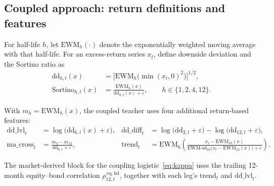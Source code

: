 \subsection{Coupled approach: return definitions and features}

For half-life \(h\), let \(\mathrm{EWM}_{h}(\cdot)\) denote the exponentially weighted moving
average with that half-life. For an excess-return series \(x_t\), define downside deviation
and the Sortino ratio as
\begin{align}
\mathrm{dd}_{h,t}(x)
&=
\Big[\mathrm{EWM}_{h}\big(\min(x_t,0)^2\big)\Big]^{1/2},
\\
\mathrm{Sortino}_{h,t}(x)
&=
\frac{\mathrm{EWM}_{h}(x)}{\mathrm{dd}_{h,t}(x)+\varepsilon},
\qquad
h\in\{1,2,4,12\}.
\end{align}

With \(m_h=\mathrm{EWM}_{h}(x)\), the coupled teacher uses four additional return-based
features:
\begin{align}
\mathrm{dd\_lvl}_t
&=
\log\!\big(\mathrm{dd}_{6,t}(x)+\varepsilon\big),
&
\mathrm{dd\_diff}_t
&=
\log\!\big(\mathrm{dd}_{2,t}+\varepsilon\big)
-
\log\!\big(\mathrm{dd}_{12,t}+\varepsilon\big),
\\
\mathrm{ma\_cross}_t
&=
\frac{m_{3}-m_{12}}{\mathrm{dd}_{6,t}+\varepsilon},
&
\mathrm{trend}_t
&=
\mathrm{EWM}_{6}\!\left(
\frac{x_t-\mathrm{EWM}_{12}(x)}
{\mathrm{EWM\text{-}sd}_{24}\!\big(x_t-\mathrm{EWM}_{12}(x)\big)+\varepsilon}
\right).
\end{align}

The market-derived block for the coupling logistic~\eqref{eq:kappa} uses the trailing
12-month equity--bond correlation \(\rho^{\,\mathrm{eq,bd}}_{12,t}\), together with each
leg's \(\mathrm{trend}_t\) and \(\mathrm{dd\_lvl}_t\).

